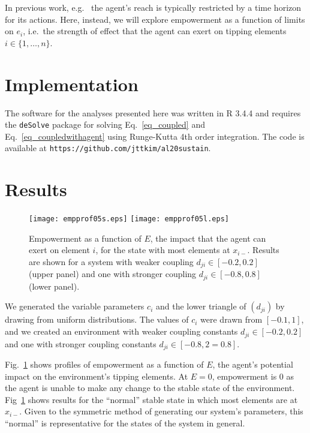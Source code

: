 \documentclass[letterpaper]{article}
\newcommand{\agentimpact}{\ensuremath{e}}
\begin{document}
In previous work, e.g.\ \cite{Salge2014_empowermentintro}
the agent's reach is typically restricted by a time horizon for its actions. Here, instead, we will explore empowerment as a function of limits on
$\agentimpact_i$, i.e.\ the strength of  effect that the
agent can exert on tipping elements $i \in \{1, \ldots, n\}$.


\section{Implementation}

The software for the analyses presented here was written in R 3.4.4
\citep{RManual2018} and requires the \texttt{deSolve} package for
solving Eq.~\ref{eq_coupled} and
Eq.~\ref{eq_coupledwithagent} using Runge-Kutta 4th order integration.
The code is available at
\texttt{https://github.com/jttkim/al20sustain}.


\section{Results}

\begin{figure}
  \begin{center}
    \texttt{[image: empprof05s.eps]}
    \texttt{[image: empprof05l.eps]}
    \caption{Empowerment as a function of $E$, the impact that the
      agent can exert on element $i$, for the state with most elements
      at $x_{i-}$. Results are shown for a system with weaker coupling
      $d_{ji} \in [-0.2, 0.2]$ (upper panel) and one with stronger
      coupling $d_{ji} \in [-0.8, 0.8]$ (lower panel).}
    \label{fig_empowermentprofiles}
  \end{center}
\end{figure}
We generated the variable parameters $c_i$ and the lower triangle of
$(d_{ji})$ by drawing from uniform distributions. The values of $c_i$
were drawn from $[-0.1, 1]$, and we created an environment with weaker
coupling constants $d_{ji} \in [-0.2, 0.2]$ and one with stronger
coupling constants $d_{ji} \in [-0.8, 2=0.8]$.

Fig.~\ref{fig_empowermentprofiles} shows profiles of empowerment as a
function of $E$, the agent's potential impact on the environment's
tipping elements. At $E = 0$, empowerment is $0$ as the agent is
unable to make any change to the stable state of the environment.
Fig~\ref{fig_empowermentprofiles} shows results for the ``normal''
stable state in which most elements are at $x_{i-}$. Given to the
symmetric method of generating our system's parameters, this
``normal'' is representative for the states of the system in general.
\end{document}
